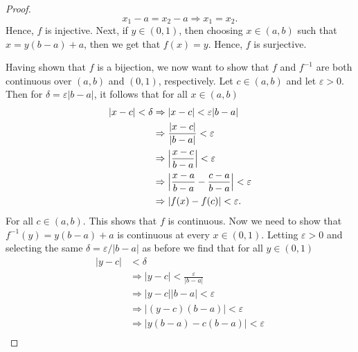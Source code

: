 \documentclass[12pt]{article}
\theoremstyle{definition}
\newcommand{\abs}[1]{\lvert #1 \rvert}
\newcommand{\bigabs}[1]{\Bigl \lvert #1 \Bigr \rvert}
\begin{document}
\begin{enumerate}
\begin{proof}
\begin{equation*}
                    x_1-a=x_2-a\Rightarrow x_1=x_2.
                \end{equation*}
                Hence, $f$ is injective. Next, if $y\in (0, 1)$, then choosing
                $x\in(a, b)$ such that $x=y(b-a)+a$, then we get that $f(x)=y$.
                Hence, $f$ is surjective.\par\hspace{4mm} Having shown that $f$
                is a bijection, we now want to show that $f$ and $f^{-1}$ are
                both continuous over $(a, b)$ and $(0, 1)$, respectively. Let
                $c\in (a, b)$ and let $\varepsilon>0$. Then for
                $\delta=\varepsilon\abs{b-a}$, it follows that for all $x\in(a, b)$
                \begin{equation*}
                    \begin{split}
                        \abs{x-c}<\delta&\Rightarrow
                        \abs{x-c}<\varepsilon\abs{b-a} \\
                        &\Rightarrow \frac{\abs{x-c}}{\abs{b-a}}<\varepsilon \\
                        &\Rightarrow\bigabs{\frac{x-c}{b-a}}<\varepsilon \\
                        &\Rightarrow\bigabs{\frac{x-a}{b-a}-\frac{c-a}{b-a}}<\varepsilon
                        \\
                        &\Rightarrow\abs{f(x)-f(c)}<\varepsilon.
                    \end{split}
                \end{equation*}
                For all $c\in (a, b)$. This shows that $f$ is continuous. Now we need to show
                that $f^{-1}(y)=y(b-a)+a$ is continuous at every $x\in (0,1)$. Letting
                $\varepsilon>0$ and selecting the same
                $\delta=\varepsilon/\abs{b-a}$ as before we find that for all
                $y\in(0, 1)$ 
                \begin{equation*}
                    \begin{split}
                        \abs{y-c} &<\delta \\
                        &\Rightarrow \abs{y-c} < \frac{\varepsilon}{\abs{b-a}}
                        \\
                        &\Rightarrow \abs{y-c}\abs{b-a} <\varepsilon \\
                        &\Rightarrow \abs{(y-c)(b-a)} <\varepsilon \\
                        &\Rightarrow \abs{y(b-a)-c(b-a)} <\varepsilon \\

\end{split}
\end{equation*}
\end{proof}
\end{enumerate}
\end{document}

